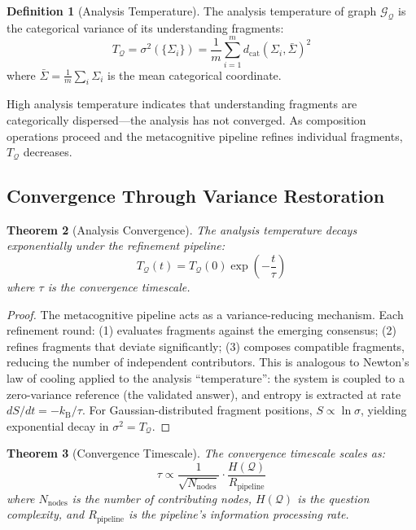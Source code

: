 \documentclass[10pt,twocolumn]{article}
\newtheorem{theorem}{Theorem}[section]
\theoremstyle{definition}
\newtheorem{definition}[theorem]{Definition}
\theoremstyle{remark}
\newcommand{\kB}{k_{\mathrm{B}}}
\newcommand{\dcat}{d_{\mathrm{cat}}}
\newcommand{\question}{\mathcal{Q}}
\newcommand{\graph}{\mathcal{G}}
\begin{document}
\begin{definition}[Analysis Temperature]
The analysis temperature of graph $\graph_\question$ is the categorical variance of its understanding fragments:
\begin{equation}
T_\question = \sigma^2(\{\Sigma_i\}) = \frac{1}{m} \sum_{i=1}^{m} \dcat(\Sigma_i, \bar{\Sigma})^2
\end{equation}
where $\bar{\Sigma} = \frac{1}{m} \sum_i \Sigma_i$ is the mean categorical coordinate.
\end{definition}

High analysis temperature indicates that understanding fragments are categorically dispersed---the analysis has not converged. As composition operations proceed and the metacognitive pipeline refines individual fragments, $T_\question$ decreases.

\subsection{Convergence Through Variance Restoration}

\begin{theorem}[Analysis Convergence]
\label{thm:convergence}
The analysis temperature decays exponentially under the refinement pipeline:
\begin{equation}
T_\question(t) = T_\question(0) \exp\left(-\frac{t}{\tau}\right)
\end{equation}
where $\tau$ is the convergence timescale.
\end{theorem}

\begin{proof}
The metacognitive pipeline acts as a variance-reducing mechanism. Each refinement round: (1) evaluates fragments against the emerging consensus; (2) refines fragments that deviate significantly; (3) composes compatible fragments, reducing the number of independent contributors. This is analogous to Newton's law of cooling applied to the analysis ``temperature'': the system is coupled to a zero-variance reference (the validated answer), and entropy is extracted at rate $dS/dt = -\kB / \tau$. For Gaussian-distributed fragment positions, $S \propto \ln \sigma$, yielding exponential decay in $\sigma^2 = T_\question$.
\end{proof}

\begin{theorem}[Convergence Timescale]
\label{thm:timescale}
The convergence timescale scales as:
\begin{equation}
\tau \propto \frac{1}{\sqrt{N_{\text{nodes}}}} \cdot \frac{H(\question)}{R_{\text{pipeline}}}
\end{equation}
where $N_{\text{nodes}}$ is the number of contributing nodes, $H(\question)$ is the question complexity, and $R_{\text{pipeline}}$ is the pipeline's information processing rate.
\end{theorem}
\end{document}
